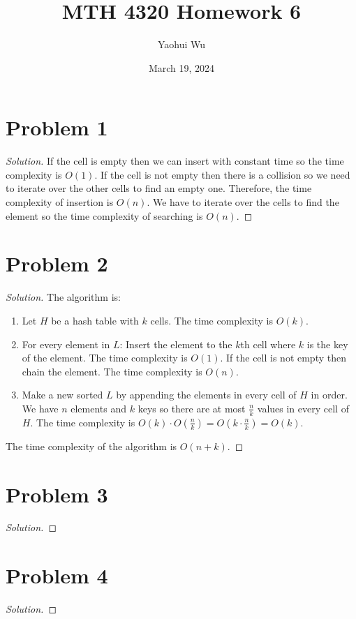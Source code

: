 \documentclass[12pt]{article}
\title{MTH 4320 Homework 6}
\author{Yaohui Wu}
\date{March 19, 2024}
\newenvironment*{solution}{\begin{proof}[Solution]}{\end{proof}}
\begin{document}
\maketitle
\section*{Problem 1}
\begin{solution}
    If the cell is empty then we can insert with constant time so the time complexity
    is \(O(1)\). If the cell is not empty then there is a collision so we need
    to iterate over the other cells to find an empty one. Therefore, the time
    complexity of insertion is \(O(n)\). We have to iterate over the cells to
    find the element so the time complexity of searching is \(O(n)\).
\end{solution}
\section*{Problem 2}
\begin{solution}
    The algorithm is:
    \begin{enumerate}
        \item Let \(H\) be a hash table with \(k\) cells. The time complexity
        is \(O(k)\).
        \item For every element in \(L\): Insert the element to the \(k\)th
        cell where \(k\) is the key of the element. The time complexity is
        \(O(1)\). If the cell is not empty then chain the element. The time
        complexity is \(O(n)\).
        \item Make a new sorted \(L\) by appending the elements in every cell
        of \(H\) in order. We have \(n\) elements and \(k\) keys so there are
        at most \(\frac{n}{k}\) values in every cell of \(H\). The time
        complexity is \(O(k)\cdot O(\frac{n}{k})=O(k\cdot\frac{n}{k})=O(k)\).
    \end{enumerate}
    The time complexity of the algorithm is \(O(n+k)\).
\end{solution}
\section*{Problem 3}
\begin{solution}
    
\end{solution}
\section*{Problem 4}
\begin{solution}
    
\end{solution}
\end{document}
